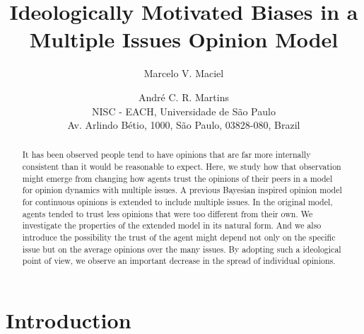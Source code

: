 \documentclass{article}
\begin{document}
\title{Ideologically Motivated Biases in a Multiple Issues Opinion Model}


\author{Marcelo V. Maciel \and Andr\'e C. R. Martins\\
	NISC - EACH, Universidade de S\~ao Paulo\\
	Av. Arlindo B\'etio, 1000, S\~ao Paulo, 03828-080, Brazil}

 

\date{}


\maketitle



\begin{abstract}
	It has been observed people tend to have opinions that are far more internally consistent than it would be reasonable to expect. Here, we study how that observation might emerge from changing how agents trust the opinions of their peers in a model for opinion dynamics with multiple issues. A previous Bayesian inspired opinion model for continuous opinions is extended to include multiple issues. In the original model, agents tended to trust less opinions that were too different from their own. We investigate the properties of the extended model in its natural form. And we also introduce the possibility the trust of the agent might depend not only on the specific issue but on the average opinions over the many issues. By adopting such a ideological point of view, we observe an important decrease in the spread of individual opinions.

	
\end{abstract}


\section{Introduction}

\end{document}

